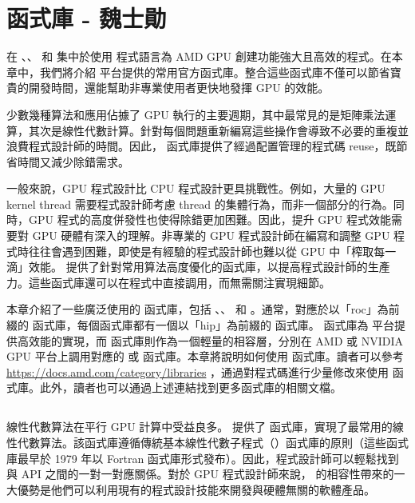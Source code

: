 \chapter{ 函式庫 - 魏士勛}
\label{chap:ROCm 函式庫}
在 、、 和  集中於使用  程式語言為 AMD GPU 創建功能強大且高效的程式。在本章中，我們將介紹  平台提供的常用官方函式庫。整合這些函式庫不僅可以節省寶貴的開發時間，還能幫助非專業使用者更快地發揮 GPU 的效能。

少數幾種算法和應用佔據了 GPU 執行的主要週期，其中最常見的是矩陣乘法運算，其次是線性代數計算。針對每個問題重新編寫這些操作會導致不必要的重複並浪費程式設計師的時間。因此， 函式庫提供了經過配置管理的程式碼 reuse，既節省時間又減少除錯需求。

一般來說，GPU 程式設計比 CPU 程式設計更具挑戰性。例如，大量的 GPU kernel thread 需要程式設計師考慮 thread 的集體行為，而非一個部分的行為。同時，GPU 程式的高度併發性也使得除錯更加困難。因此，提升 GPU 程式效能需要對 GPU 硬體有深入的理解。非專業的 GPU 程式設計師在編寫和調整 GPU 程式時往往會遇到困難，即使是有經驗的程式設計師也難以從 GPU 中「榨取每一滴」效能。 提供了針對常用算法高度優化的函式庫，以提高程式設計師的生產力。這些函式庫還可以在程式中直接調用，而無需關注實現細節。

本章介紹了一些廣泛使用的  函式庫，包括 、、 和 。通常，對應於以「roc」為前綴的  函式庫，每個函式庫都有一個以「hip」為前綴的  函式庫。 函式庫為  平台提供高效能的實現，而  函式庫則作為一個輕量的相容層，分別在 AMD 或 NVIDIA GPU 平台上調用對應的  或  函式庫。本章將說明如何使用  函式庫。讀者可以參考 \url{https://docs.amd.com/category/libraries}
，通過對程式碼進行少量修改來使用  函式庫。此外，讀者也可以通過上述連結找到更多函式庫的相關文檔。

\section{}
線性代數算法在平行 GPU 計算中受益良多。 提供了  函式庫，實現了最常用的線性代數算法。該函式庫遵循傳統基本線性代數子程式（）函式庫的原則（這些函式庫最早於 1979 年以 Fortran 函式庫形式發布）。因此，程式設計師可以輕鬆找到  與  API 之間的一對一對應關係。對於 GPU 程式設計師來說， 的相容性帶來的一大優勢是他們可以利用現有的程式設計技能來開發與硬體無關的軟體產品。


